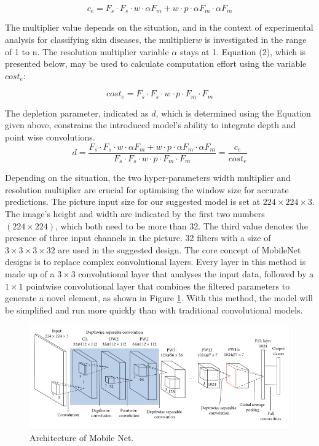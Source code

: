 \documentclass[12pt, a4paper,twoside]{report}
\theoremstyle{plain} %
\theoremstyle{definition} %
\theoremstyle{remark} %
\numberwithin{equation}{chapter}
\begin{document}
\begin{equation}
    c_e = F_s \cdot F_s \cdot w \cdot \alpha F_m + w \cdot  p \cdot \alpha F_m \cdot  \alpha F_m
\end{equation}

The multiplier value depends on the situation, and in the context of experimental analysis for classifying skin diseases, the multiplier$w$ is investigated in the range of 1 to n. The resolution multiplier variable $\alpha$ stays at 1. Equation (2), which is presented below, may be used to calculate computation effort using the variable $cost_e$:

\begin{equation}
    cost_e = F_s \cdot F_s \cdot w \cdot p \cdot F_m \cdot F_m
\end{equation}

The depletion parameter, indicated as $d$, which is determined using the Equation given above, constrains the introduced model's ability to integrate depth and point wise convolutions.
\begin{equation}
    d = \frac{F_s \cdot F_s \cdot w \cdot \alpha F_m + w \cdot  p \cdot \alpha F_m \cdot  \alpha F_m}{F_s \cdot F_s \cdot w \cdot p \cdot F_m \cdot F_m} = \frac {c_e} {cost_e}
\end{equation}

Depending on the situation, the two hyper-parameters width multiplier and resolution multiplier are crucial for optimising the window size for accurate predictions. The picture input size for our suggested model is set at $224 \times 224 \times 3$. The image's height and width are indicated by the first two numbers $(224 \times 224)$, which both need to be more than 32. The third value denotes the presence of three input channels in the picture. 32 filters with a size of $3 \times 3 \times 3 \times 32$ are used in the suggested design. The core concept of MobileNet designs is to replace complex convolutional layers. Every layer in this method is made up of a $3 \times 3$ convolutional layer that analyses the input data, followed by a $1 \times 1$ pointwise convolutional layer that combines the filtered parameters to generate a novel element, as shown in Figure \ref{fig:mobile_net_arch}. With this method, the model will be simplified and run more quickly than with traditional convolutional models.

\begin{figure}[h]
    \centering
    \includegraphics[scale=0.6]{mobile_net_arch.png}
    \caption{Architecture of Mobile Net.}
    \label{fig:mobile_net_arch}
\end{figure}
\end{document}

